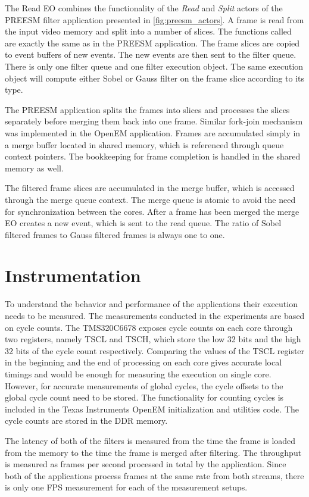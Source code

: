 The Read EO combines the functionality of the \textit{Read} and \textit{Split} actors of the PREESM filter application presented in \ref{fig:preesm_actors}. A frame is read from the input video memory and split into a number of slices. The functions called are exactly the same as in the PREESM application. The frame slices are copied to event buffers of new events. The new events are then sent to the filter queue. There is only one filter queue and one filter execution object. The same execution object will compute either Sobel or Gauss filter on the frame slice according to its type.

The PREESM application splits the frames into slices and processes the slices separately before merging them back into one frame. Similar fork-join mechanism was implemented in the OpenEM application. Frames are accumulated simply in a merge buffer located in shared memory, which is referenced through queue context pointers. The bookkeeping for frame completion is handled in the shared memory as well.

The filtered frame slices are accumulated in the merge buffer, which is accessed through the merge queue context. The merge queue is atomic to avoid the need for synchronization between the cores. After a frame has been merged the merge EO creates a new event, which is sent to the read queue. The ratio of Sobel filtered frames to Gauss filtered frames is always one to one.

\section{Instrumentation}
\label{sec:instrumentation}
To understand the behavior and performance of the applications their execution needs to be measured. The measurements conducted in the experiments are based on cycle counts. The TMS320C6678 exposes cycle counts on each core through two registers, namely TSCL and TSCH, which store the low 32 bits and the high 32 bits of the cycle count respectively. Comparing the values of the TSCL register in the beginning and the end of processing on each core gives accurate local timings and would be enough for measuring the execution on single core. However, for accurate measurements of global cycles, the cycle offsets to the global cycle count need to be stored. The functionality for counting cycles is included in the Texas Instruments OpenEM initialization and utilities code. The cycle counts are stored in the DDR memory.

The latency of both of the filters is measured from the time the frame is loaded from the memory to the time the frame is merged after filtering. The throughput is measured as frames per second processed in total by the application. Since both of the applications process frames at the same rate from both streams, there is only one FPS measurement for each of the measurement setups.

